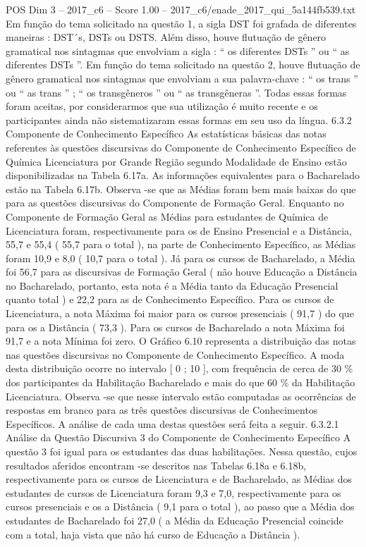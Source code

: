 \begin{textsample}{POS Dim 3 – 2017\_c6 – Score 1.00 – 2017\_c6/enade\_2017\_qui\_5a144fb539.txt}
Em função do tema solicitado na questão 1, a sigla DST foi grafada de diferentes maneiras : DST´s, DSTs ou DSTS.
Além disso, houve flutuação de gênero gramatical nos sintagmas que envolviam a sigla : “ os diferentes DSTs ” ou “ as diferentes DSTs ”.
Em função do tema solicitado na questão 2, houve flutuação de gênero gramatical nos sintagmas que envolviam a sua palavra-chave : “ os trans ” ou “ as trans ” ; “ os transgêneros ” ou “ as transgêneras ”.
Todas essas formas foram aceitas, por considerarmos que sua utilização é muito recente e os participantes ainda não sistematizaram essas formas em seu uso da língua. 6.3.2 Componente de Conhecimento Específico As estatísticas básicas das notas referentes às questões discursivas do Componente de Conhecimento Específico de Química Licenciatura por Grande Região segundo Modalidade de Ensino estão disponibilizadas na Tabela 6.17a.
As informações equivalentes para o Bacharelado estão na Tabela 6.17b.
Observa -se que as Médias foram bem mais baixas do que para as questões discursivas do Componente de Formação Geral.
Enquanto no Componente de Formação Geral as Médias para estudantes de Química de Licenciatura foram, respectivamente para os de Ensino Presencial e a Distância, 55,7 e 55,4 ( 55,7 para o total ), na parte de Conhecimento Específico, as Médias foram 10,9 e 8,0 ( 10,7 para o total ).
Já para os cursos de Bacharelado, a Média foi 56,7 para as discursivas de Formação Geral ( não houve Educação a Distância no Bacharelado, portanto, esta nota é a Média tanto da Educação Presencial quanto total ) e 22,2 para as de Conhecimento Específico.
Para os cursos de Licenciatura, a nota Máxima foi maior para os cursos presenciais ( 91,7 ) do que para os a Distância ( 73,3 ).
Para os cursos de Bacharelado a nota Máxima foi 91,7 e a nota Mínima foi zero.
O Gráfico 6.10 representa a distribuição das notas nas questões discursivas no Componente de Conhecimento Específico.
A moda desta distribuição ocorre no intervalo [ 0 ; 10 ], com frequência de cerca de 30 \% dos participantes da Habilitação Bacharelado e mais do que 60 \% da Habilitação Licenciatura.
Observa -se que nesse intervalo estão computadas as ocorrências de respostas em branco para as três questões discursivas de Conhecimentos Específicos.
A análise de cada uma destas questões será feita a seguir. 6.3.2.1 Análise da Questão Discursiva 3 do Componente de Conhecimento Específico A questão 3 foi igual para os estudantes das duas habilitações.
Nessa questão, cujos resultados aferidos encontram -se descritos nas Tabelas 6.18a e 6.18b, respectivamente para os cursos de Licenciatura e de Bacharelado, as Médias dos estudantes de cursos de Licenciatura foram 9,3 e 7,0, respectivamente para os cursos presenciais e os a Distância ( 9,1 para o total ), ao passo que a Média dos estudantes de Bacharelado foi 27,0 ( a Média da Educação Presencial coincide com a total, haja vista que não há curso de Educação a Distância ).

\end{textsample}
